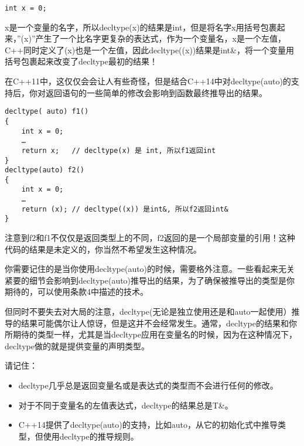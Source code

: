 \begin{lstlisting}
int x = 0;
\end{lstlisting}

x是一个变量的名字，所以decltype(x)的结果是int，但是将名字x用括号包裹起来，”(x)”产生了一个比名字更复杂的表达式，作为一个变量名，x是一个左值，C++同时定义了(x)也是一个左值，因此decltype((x))结果是int\&，将一个变量用括号包裹起来改变了decltype最初的结果！

在C++11中，这仅仅会会让人有些奇怪，但是结合C++14中对decltype(auto)的支持后，你对返回语句的一些简单的修改会影响到函数最终推导出的结果。

\begin{lstlisting}
decltype( auto) f1() 
{ 
	int x = 0;
	… 
	return x;   // decltype(x) 是 int, 所以f1返回int 
} 
decltype(auto) f2() 
{ 
	int x = 0; 
	… 
	return (x); // decltype((x)) 是int&, 所以f2返回int& 
}
\end{lstlisting}

注意到f2和f1不仅仅是返回类型上的不同，f2返回的是一个局部变量的引用！这种代码的结果是未定义的，你当然不希望发生这种情况。

你需要记住的是当你使用decltype(auto)的时候，需要格外注意。一些看起来无关紧要的细节会影响到decltype(auto)推导出的结果，为了确保被推导出的类型是你期待的，可以使用条款4中描述的技术。

但同时不要失去对大局的注意，decltype(无论是独立使用还是和auto一起使用）推导的结果可能偶尔让人惊讶，但是这并不会经常发生。通常，decltype的结果和你所期待的类型一样，尤其是当decltype应用在变量名的时候，因为在这种情况下，decltype做的就是提供变量的声明类型。

\begin{mdframed}
请记住：
\begin{itemize}
\item{decltype几乎总是返回变量名或是表达式的类型而不会进行任何的修改。}
\item{对于不同于变量名的左值表达式，decltype的结果总是T\&。}
\item{C++14提供了decltype(auto)的支持，比如auto，从它的初始化式中推导类型，但使用decltype的推导规则。} 
\end{itemize}
\end{mdframed}









































